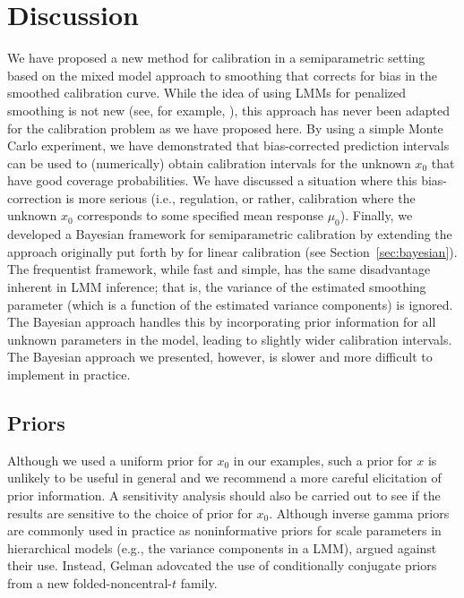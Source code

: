 \documentclass[cmfont,usenames,dvipsnames,leqno]{afit-etd}\usepackage[]{graphicx}\usepackage[]{color}
\begin{document}
\section{Discussion}
\label{sec:semipar-discussion}
We have proposed a new method for calibration in a semiparametric setting based on the mixed model approach to smoothing that corrects for bias in the smoothed calibration curve. While the idea of using LMMs for penalized smoothing is not new (see, for example, \citet[pp. 13 - 17]{demidenko_mixed_2013}), this approach has never been adapted for the calibration problem as we have proposed here. By using a simple Monte Carlo experiment, we have demonstrated that bias-corrected prediction intervals can be used to (numerically) obtain calibration intervals for the unknown $x_0$ that have good coverage probabilities. We have discussed a situation where this bias-correction is more serious (i.e., regulation, or rather, calibration where the unknown $x_0$ corresponds to some specified mean response $\mu_0$). Finally, we developed a Bayesian framework for semiparametric calibration by extending the approach originally put forth by \citet{hoadley_bayesian_1970} for linear calibration (see Section~\ref{sec:bayesian}). The frequentist framework, while fast and simple, has the same disadvantage inherent in LMM inference; that is, the variance of the estimated smoothing parameter (which is a function of the estimated variance components) is ignored. The Bayesian approach handles this by incorporating prior information for all unknown parameters in the model, leading to slightly wider calibration intervals. The Bayesian approach we presented, however, is slower and more difficult to implement in practice.

\subsection{Priors}
Although we used a uniform prior for $x_0$ in our examples, such a prior for $x$ is unlikely to be useful in general and we recommend a more careful elicitation of prior information. A sensitivity analysis should also be carried out to see if the results are sensitive to the choice of prior for $x_0$. Although inverse gamma priors are commonly used in practice as noninformative priors for scale parameters in hierarchical models (e.g., the variance components in a LMM), \citet{gelman_prior_2006} argued against their use. Instead, Gelman adovcated the use of conditionally conjugate priors from a new folded-noncentral-$t$ family.
\end{document}

